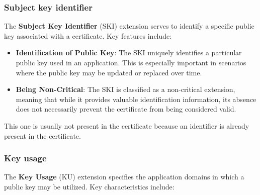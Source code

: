 \subsubsection{Subject key identifier}
The \textbf{Subject Key Identifier} (SKI) extension serves
to identify a specific public key associated with a certificate. Key
features include:

\begin{itemize}
  \item \textbf{Identification of Public Key}: The SKI uniquely
    identifies a particular public key used in an application. This
    is especially important in scenarios where the public key may be
    updated or replaced over time.

  \item \textbf{Being Non-Critical}: The SKI is classified as a
    non-critical extension, meaning that while it provides valuable
    identification information, its absence does not necessarily
    prevent the certificate from being considered valid.
\end{itemize}
This one is usually not present in the certificate because an
identifier is already present in the certificate.
\subsubsection{Key usage}

The \textbf{Key Usage} (KU) extension specifies the application
domains in which a public key may be utilized. Key characteristics
include:

